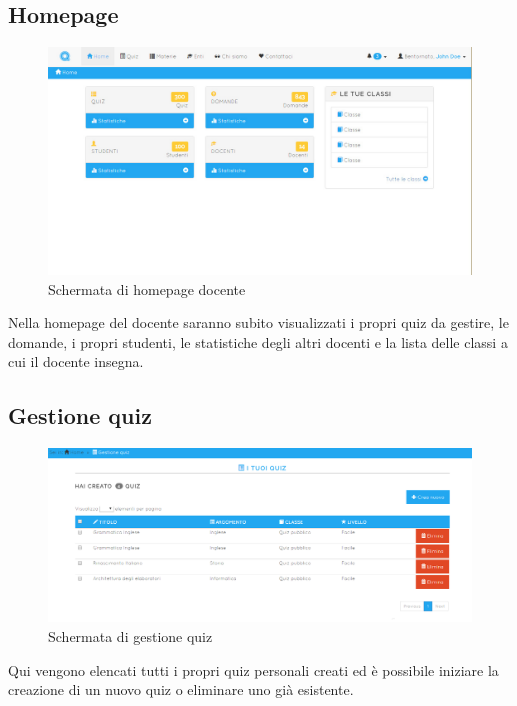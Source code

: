 \documentclass[a4paper, titlepage]{article}
\begin{document}
	 \subsection{Homepage}
	 \begin{figure}[!h]
	 	\centering
	 	\includegraphics[scale=0.33]{Img/screen_HomepageDocente.png}
	 	\caption{Schermata di homepage docente}
	 \end{figure}
	 Nella homepage del docente saranno subito visualizzati i propri quiz da gestire, le domande, i propri studenti, le statistiche degli altri docenti e la lista delle classi a cui il docente insegna.
	 
	 
	 \subsection{Gestione quiz}
	 \begin{figure}[!h]
	 	\centering
	 	\includegraphics[scale=0.33]{Img/screen_GestioneQuiz.png}
	 	\caption{Schermata di gestione quiz}
	 \end{figure}
	 Qui vengono elencati tutti i propri quiz personali creati ed è possibile iniziare la creazione di un nuovo quiz o eliminare uno già esistente.
	 
\end{document}
